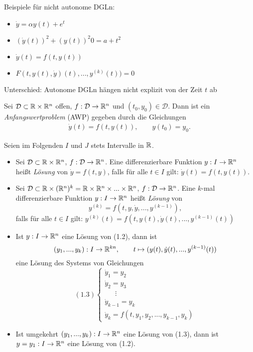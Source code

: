 \documentclass{cheat-sheet}
\newcommand{\D}{\mathcal{D}}
\begin{document}
Beispiele für nicht autonome DGLn:
\begin{itemize}
  \item $\dot{y} = \alpha y(t) + e^{t}$
  \item $(\dot{y}(t))^2 + (y(t))^2 0= a + t^2$
  \item $\dot{y}(t) = f(t, y(t))$
  \item $F(t, y(t), \dot{y})(t), ..., y^{(k)}(t)) = 0$
\end{itemize}

Unterschied: Autonome DGLn hängen nicht explizit von der Zeit $t$ ab
\fi

\begin{defn}
  Sei $\D \subset \R \times \R^n$ offen, $f : \D \to \R^n$ und $(t_0, y_0) \in \D$. Dann ist ein \emph{Anfangswertproblem} (AWP) gegeben durch die Gleichungen
  \begin{align}
    \dot{y}(t) = f(t, y(t)), \qquad
    y(t_0) = y_0. \tag{1.1}
  \end{align}
\end{defn}

\begin{nota}
  Seien im Folgenden $I$ und $J$ stets Intervalle in $\mathbb{R}$.
\end{nota}

\begin{defn}
  \begin{itemize}
    \item Sei $\D \subset \R \times \R^n$, $f : \D \to \R^n$. Eine differenzierbare Funktion $y : I \to \mathbb{R}^n$ heißt \emph{Lösung} von $\dot{y} = f(t, y)$, falls für alle $t \in I$ gilt: $\dot{y}(t) = f(t, y(t))$.
    \item Sei $\D \subset \R \times (\R^n)^k = \R \times \R^n \times ... \times \R^n$, $f : \D \to \R^n$. Eine $k$-mal differenzierbare Funktion $y : I \to \mathbb{R}^n$ heißt \emph{Lösung} von
    \[ y^{(k)} = f(t, y, \dot{y}, ..., y^{(k-1)}), \tag{1.2} \]
    falls für alle $t \in I$ gilt:
    $y^{(k)}(t) = f(t, y(t), \dot{y}(t), ..., y^{(k-1)}(t))$
  \end{itemize}
\end{defn}

\begin{satz}
  \begin{itemize}
    \item Ist $y : I \to \mathbb{R}^n$ eine Lösung von (1.2), dann ist
    \[
      (y_1, ..., y_k) : I \to \mathbb{R}^{kn},\qquad
      t \mapsto (y(t), \dot{y}(t), ..., y^{(k-1)}(t))
    \]
    eine Lösung des Systems von Gleichungen
    \[
      (1.3) \left\{ \begin{array}{ll}
      \dot{y}_1 = y_2\\
      \dot{y}_2 = y_3\\
      \quad\enspace\vdots\\
      \dot{y}_{k-1} = y_k\\
      \dot{y}_k = f(t, y_1, y_2, ..., y_{k-1}, y_k)
      \end{array} \right.
    \]
    \item Ist umgekehrt $(y_1, ..., y_k) : I \to \mathbb{R}^n$ eine Lösung von (1.3), dann ist $y = y_1 : I \to \mathbb{R}^n$ eine Lösung von (1.2).
  \end{itemize}
\end{satz}
\end{document}
